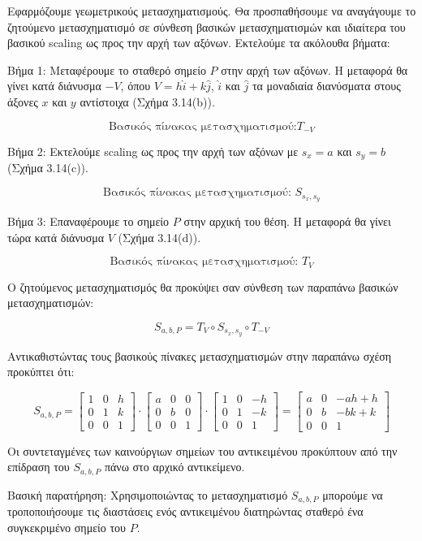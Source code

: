 \begin{solution}
Εφαρμόζουμε γεωμετρικούς μετασχηματισμούς. Θα προσπαθήσουμε να αναγάγουμε το ζητούμενο μετασχηματισμό σε σύνθεση βασικών μετασχηματισμών και ιδιαίτερα του βασικού scaling ως προς την αρχή των αξόνων. Εκτελούμε τα ακόλουθα βήματα:

Βήμα 1: Μεταφέρουμε το σταθερό σημείο $P$ στην αρχή των αξόνων. Η μεταφορά θα γίνει κατά διάνυσμα $-V$, όπου $V = h\hat{i} + k\hat{j}$, $\hat{i}$ και $\hat{j}$ τα μοναδιαία διανύσματα στους άξονες $x$ και $y$ αντίστοιχα (Σχήμα 3.14(b)).



\[
\text{Βασικός πίνακας μετασχηματισμού:} T_{-V}
\]

Βήμα 2: Εκτελούμε scaling ως προς την αρχή των αξόνων με $s_x = a$ και $s_y = b$ (Σχήμα 3.14(c)).

\[
\text{Βασικός πίνακας μετασχηματισμού: } S_{s_x, s_y}
\]

Βήμα 3: Επαναφέρουμε το σημείο $P$ στην αρχική του θέση. Η μεταφορά θα γίνει τώρα κατά διάνυσμα $V$ (Σχήμα 3.14(d)).

\[
\text{Βασικός πίνακας μετασχηματισμού: } T_V
\]

Ο ζητούμενος μετασχηματισμός θα προκύψει σαν σύνθεση των παραπάνω βασικών μετασχηματισμών:

\[
S_{a,b,P} = T_V \circ S_{s_x, s_y} \circ T_{-V}
\]

Αντικαθιστώντας τους βασικούς πίνακες μετασχηματισμών στην παραπάνω σχέση προκύπτει ότι:

\[
S_{a,b,P} =
\begin{bmatrix}
1 & 0 & h \\
0 & 1 & k \\
0 & 0 & 1
\end{bmatrix}
\cdot
\begin{bmatrix}
a & 0 & 0 \\
0 & b & 0 \\
0 & 0 & 1
\end{bmatrix}
\cdot
\begin{bmatrix}
1 & 0 & -h \\
0 & 1 & -k \\
0 & 0 & 1
\end{bmatrix}
=
\begin{bmatrix}
a & 0 & -ah + h \\
0 & b & -bk + k \\
0 & 0 & 1
\end{bmatrix}
\]

Οι συντεταγμένες των καινούργιων σημείων του αντικειμένου προκύπτουν από την επίδραση του $S_{a,b,P}$ πάνω στο αρχικό αντικείμενο.

Βασική παρατήρηση: Χρησιμοποιώντας το μετασχηματισμό $S_{a,b,P}$ μπορούμε να τροποποιήσουμε τις διαστάσεις ενός αντικειμένου διατηρώντας σταθερό ένα συγκεκριμένο σημείο του $P$.
\end{solution}